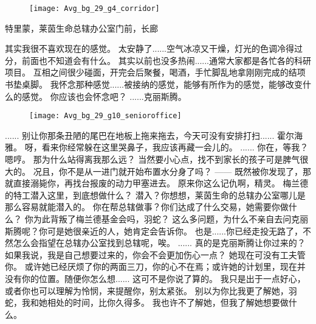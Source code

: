 \documentclass[openany]{book}
\begin{document}
\begin{figure}[h]
    \centering
    \texttt{[image: Avg\_bg\_29\_g4\_corridor]}
\end{figure}
特里蒙，莱茵生命总辖办公室门前，长廊
\begin{dialogue}
     其实我很不喜欢现在的感觉。
     太安静了......空气冰凉又干燥，灯光的色调冷得过分，前面也不知道会有什么。
     其实以前也没多热闹......通常大家都是各忙各的科研项目。
     互相之间很少碰面，开完会后聚餐，喝酒，手忙脚乱地拿刚刚完成的结项书垫桌脚。
     我怀念那种感觉......被接纳的感觉，能够有所作为的感觉，能够改变什么的感觉。
     你应该也会怀念吧？
     ......克丽斯腾。
    \begin{figure}[h]
        \centering
        \texttt{[image: Avg\_bg\_29\_g10\_senioroffice]}
    \end{figure}
     ......
     别让你那条丑陋的尾巴在地板上拖来拖去，今天可没有安排打扫......
     霍尔海雅。
     呀，看来你经常躲在这里哭鼻子，我应该再藏一会儿的。
     ......
     你在，等我？
     嗯哼。
     那为什么站得离我那么远？
     当然要小心点，找不到家长的孩子可是脾气很大的。
     况且，你不是从一进门就开始布置水分身了吗？
     ——
     既然被你发现了，那就直接溺毙你，再找台报废的动力甲塞进去。
     原来你这么记仇啊，精灵。
     梅兰德的特工潜入这里，到底想做什么？
     潜入？你想想，莱茵生命的总辖办公室哪儿是那么容易就能潜入的。
     你在帮总辖做事？你们达成了什么交易，她需要你做什么？
     你为此背叛了梅兰德基金会吗，羽蛇？
     这么多问题，为什么不亲自去问克丽斯腾呢？你可是她很亲近的人，她肯定会告诉你。
     也是......你已经走投无路了，不然怎么会指望在总辖办公室找到总辖呢，唉。
     ......
     真的是克丽斯腾让你过来的？
     如果我说，我是自己想要过来的，你会不会更加伤心一点？
     她现在可没有工夫管你。
     或许她已经厌烦了你的两面三刀，你的心不在焉；或许她的计划里，现在并没有你的位置。随便你怎么想......
     这可不是你说了算的。
     我只是出于一点好心，或者你也可以理解为怜悯，来提醒你，别太紧张。
     别以为你比我更了解她，羽蛇，我和她相处的时间，比你久得多。
     我也许不了解她，但我了解她想要做什么。
\end{dialogue}
\end{document}
